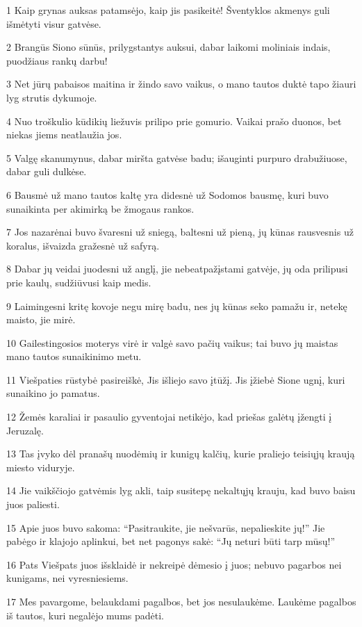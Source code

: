 \par 1 Kaip grynas auksas patamsėjo, kaip jis pasikeitė! Šventyklos akmenys guli išmėtyti visur gatvėse. 
\par 2 Brangūs Siono sūnūs, prilygstantys auksui, dabar laikomi moliniais indais, puodžiaus rankų darbu! 
\par 3 Net jūrų pabaisos maitina ir žindo savo vaikus, o mano tautos duktė tapo žiauri lyg strutis dykumoje. 
\par 4 Nuo troškulio kūdikių liežuvis prilipo prie gomurio. Vaikai prašo duonos, bet niekas jiems neatlaužia jos. 
\par 5 Valgę skanumynus, dabar miršta gatvėse badu; išauginti purpuro drabužiuose, dabar guli dulkėse. 
\par 6 Bausmė už mano tautos kaltę yra didesnė už Sodomos bausmę, kuri buvo sunaikinta per akimirką be žmogaus rankos. 
\par 7 Jos nazarėnai buvo švaresni už sniegą, baltesni už pieną, jų kūnas rausvesnis už koralus, išvaizda gražesnė už safyrą. 
\par 8 Dabar jų veidai juodesni už anglį, jie nebeatpažįstami gatvėje, jų oda prilipusi prie kaulų, sudžiūvusi kaip medis. 
\par 9 Laimingesni kritę kovoje negu mirę badu, nes jų kūnas seko pamažu ir, netekę maisto, jie mirė. 
\par 10 Gailestingosios moterys virė ir valgė savo pačių vaikus; tai buvo jų maistas mano tautos sunaikinimo metu. 
\par 11 Viešpaties rūstybė pasireiškė, Jis išliejo savo įtūžį. Jis įžiebė Sione ugnį, kuri sunaikino jo pamatus. 
\par 12 Žemės karaliai ir pasaulio gyventojai netikėjo, kad priešas galėtų įžengti į Jeruzalę. 
\par 13 Tas įvyko dėl pranašų nuodėmių ir kunigų kalčių, kurie praliejo teisiųjų kraują miesto viduryje. 
\par 14 Jie vaikščiojo gatvėmis lyg akli, taip susitepę nekaltųjų krauju, kad buvo baisu juos paliesti. 
\par 15 Apie juos buvo sakoma: “Pasitraukite, jie nešvarūs, nepalieskite jų!” Jie pabėgo ir klajojo aplinkui, bet net pagonys sakė: “Jų neturi būti tarp mūsų!” 
\par 16 Pats Viešpats juos išsklaidė ir nekreipė dėmesio į juos; nebuvo pagarbos nei kunigams, nei vyresniesiems. 
\par 17 Mes pavargome, belaukdami pagalbos, bet jos nesulaukėme. Laukėme pagalbos iš tautos, kuri negalėjo mums padėti. 
